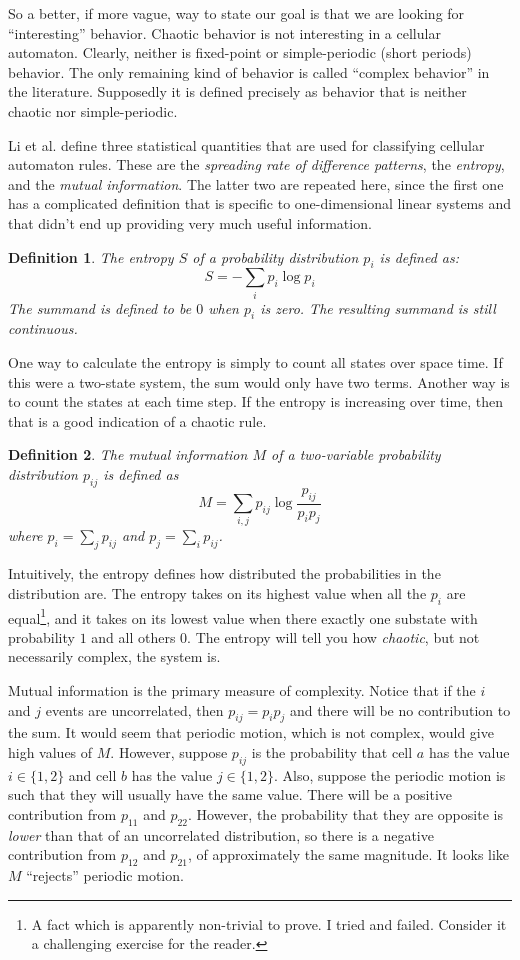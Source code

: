 \documentclass[12pt]{article}
\newtheorem*{Definition}{Definition}
\begin{document}
So a better, if more vague, way to state our goal is that we are looking
for ``interesting'' behavior.  Chaotic behavior is not interesting in a
cellular automaton.  Clearly, neither is fixed-point or simple-periodic
(short periods) behavior.  The only remaining kind of behavior is called
``complex behavior'' in the literature.  Supposedly it is defined
precisely as behavior that is neither chaotic nor simple-periodic.

Li et al. \cite{Li-1990} define three statistical quantities that are
used for classifying cellular automaton rules.  These are the
\textit{spreading rate of difference patterns}, the \textit{entropy},
and the \textit{mutual information}.  The latter two are repeated here,
since the first one has a complicated definition that is specific to
one-dimensional linear systems and that didn't end up providing very
much useful information.

\begin{Definition}
The entropy $S$ of a probability distribution $p_i$ is defined as:
\[ S = -\sum_i{p_i \log p_i} \]
The summand is defined to be $0$ when $p_i$ is zero.  The resulting
summand is still continuous.
\end{Definition}

One way to calculate the entropy is simply to count all states over
space time.  If this were a two-state system, the sum would only have
two terms.  Another way is to count the states at each time step.  If
the entropy is increasing over time, then that is a good indication of a
chaotic rule.

\begin{Definition}
The mutual information $M$ of a two-variable probability distribution
$p_{ij}$ is defined as
\[ M = \sum_{i,j}{p_{ij} \log \frac{p_{ij}}{p_i p_j}} \]
where $p_i = \sum_j{p_{ij}}$ and $p_j = \sum_i{p_{ij}}$.
\end{Definition}

Intuitively, the entropy defines how distributed the probabilities in
the distribution are.  The entropy takes on its highest value when all
the $p_i$ are equal\footnote{A fact which is apparently non-trivial to
prove.  I tried and failed.  Consider it a challenging exercise for the
reader.}, and it takes on its lowest value when there exactly one
substate with probability $1$ and all others $0$.  The entropy will tell
you how \textit{chaotic}, but not necessarily complex, the system is.

Mutual information is the primary measure of complexity.  Notice that if
the $i$ and $j$ events are uncorrelated, then $p_{ij} = p_i p_j$ and
there will be no contribution to the sum.  It would seem that periodic
motion, which is not complex, would give high values of $M$.  However,
suppose $p_{ij}$ is the probability that cell $a$ has the value $i \in
\{1,2\}$ and cell $b$ has the value $j \in \{1,2\}$.  Also, suppose the
periodic motion is such that they will usually have the same value.
There will be a positive contribution from $p_{11}$ and $p_{22}$.
However, the probability that they are opposite is \textit{lower} than
that of an uncorrelated distribution, so there is a negative
contribution from $p_{12}$ and $p_{21}$, of approximately the same
magnitude.  It looks like $M$ ``rejects'' periodic motion.
\end{document}
